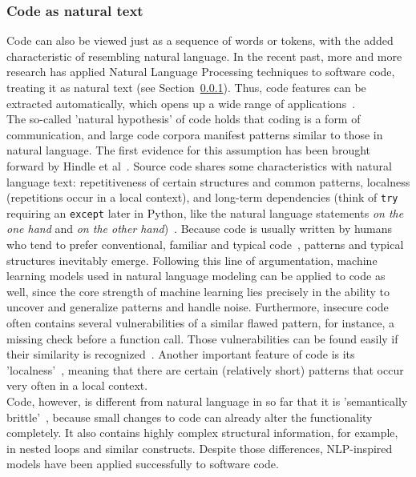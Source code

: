 \documentclass[
a4paper,
pagesize,
pdftex,
12pt,
twoside, %
BCOR=5mm, %
ngerman,
fleqn,
final,
]{scrartcl}
\begin{document}
	\subsubsection{Code as natural text}\label{Natural-Hypothesis}\label{Semantically-Brittle}
	Code can also be viewed just as a sequence of words or tokens, with the added characteristic of resembling natural language. In the recent past, more and more research has applied Natural Language Processing techniques to software code, treating it as natural text (see Section~\ref{Natural-Hypothesis}). Thus, code features can be extracted automatically, which opens up a wide range of applications~\cite{Dam.2017}.\\
	The so-called 'natural hypothesis' of code holds that coding is a form of communication, and large code corpora manifest patterns similar to those in natural language. The first evidence for this assumption has been brought forward by Hindle et al~\cite{Hindle.2012}.
	Source code shares some characteristics with natural language text: repetitiveness of certain structures and common patterns, localness (repetitions occur in a local context), and long-term dependencies (think of \texttt{try} requiring an \texttt{except} later in Python, like the natural language statements \textit{on the one hand} and \textit{on the other hand})~\cite{Dam.2016}.
	Because code is usually written by humans who tend to prefer conventional, familiar and typical code~\cite{Allamanis.2018}, patterns and typical structures inevitably emerge. Following this line of argumentation, machine learning models used in natural language modeling can be applied to code as well, since the core strength of machine learning lies precisely in the ability to uncover and generalize patterns and handle noise. Furthermore, insecure code often contains several vulnerabilities of a similar flawed pattern, for instance, a missing check before a function call. Those vulnerabilities can be found easily if their similarity is recognized~\cite{Yamaguchi.2012}. 
	Another important feature of code is its 'localness'~\cite{Tu.2014}, meaning that there are certain (relatively short) patterns that occur very often in a local context.\\ 
	Code, however, is different from natural language in so far that it is 'semantically brittle'~\cite{Allamanis.2018}, because small changes to code can already alter the functionality completely. It also contains highly complex structural information, for example, in nested loops and similar constructs. Despite those differences, NLP-inspired models have been applied successfully to software code.
	
\end{document}
